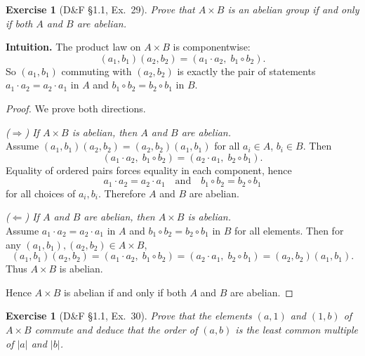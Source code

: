\documentclass[12pt]{article}
\newtheorem{exercise}[theorem]{Exercise}
\theoremstyle{definition}
\begin{document}
\newpage

\begin{exercise}[D\&F §1.1, Ex.~29]
Prove that $A\times B$ is an abelian group if and only if both $A$ and $B$ are abelian.
\end{exercise}

\dotfill

\noindent
\textbf{Intuition.}
The product law on $A\times B$ is componentwise:
\[
(a_1,b_1)(a_2,b_2)=(a_1\cdot a_2,\; b_1\circ b_2).
\]
So $(a_1,b_1)$ commuting with $(a_2,b_2)$ is exactly the pair of statements
$a_1\cdot a_2=a_2\cdot a_1$ in $A$ and $b_1\circ b_2=b_2\circ b_1$ in $B$.

\dotfill

\begin{proof}
We prove both directions.

\dotfill

\noindent\emph{($\Rightarrow$) If $A\times B$ is abelian, then $A$ and $B$ are abelian.}\\

\noindent
Assume $(a_1,b_1)(a_2,b_2)=(a_2,b_2)(a_1,b_1)$ for all $a_i\in A$, $b_i\in B$.
Then
\[
(a_1\cdot a_2,\; b_1\circ b_2)=(a_2\cdot a_1,\; b_2\circ b_1).
\]
Equality of ordered pairs forces equality in each component, hence
\[
a_1\cdot a_2=a_2\cdot a_1 \quad\text{and}\quad b_1\circ b_2=b_2\circ b_1
\]
for all choices of $a_i,b_i$. Therefore $A$ and $B$ are abelian.

\dotfill

\noindent\emph{($\Leftarrow$) If $A$ and $B$ are abelian, then $A\times B$ is abelian.}\\

\noindent
Assume $a_1\cdot a_2=a_2\cdot a_1$ in $A$ and $b_1\circ b_2=b_2\circ b_1$ in $B$ for all elements.
Then for any $(a_1,b_1),(a_2,b_2)\in A\times B$,
\[
(a_1,b_1)(a_2,b_2)=(a_1\cdot a_2,\; b_1\circ b_2)=(a_2\cdot a_1,\; b_2\circ b_1)=(a_2,b_2)(a_1,b_1).
\]
Thus $A\times B$ is abelian.

\dotfill

\noindent
Hence $A\times B$ is abelian if and only if both $A$ and $B$ are abelian.
\end{proof}

\newpage

\begin{exercise}[D\&F §1.1, Ex.~30]
Prove that the elements $(a,1)$ and $(1,b)$ of $A\times B$ commute and deduce that the order of $(a,b)$ is the least common multiple of $|a|$ and $|b|$.
\end{exercise}
\end{document}
